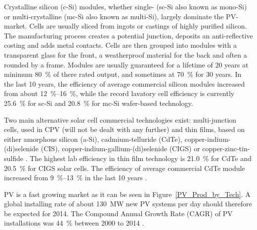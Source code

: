 Crystalline silicon (c-Si) modules, whether single- (sc-Si also known as mono-Si) or multi-crystalline (mc-Si also known as multi-Si), largely dominate the PV-market. Cells are usually sliced from ingots or castings of highly purified silicon. The manufacturing process creates a potential junction, deposits an anti-reflective costing and adds metal contacts. Cells are then grouped into modules with a transparent glass for the front, a weatherproof material for the back and often a rounded by a frame. Modules are usually guaranteed for a lifetime of 20 years at minimum \SI{80}{\percent} of there rated output, and sometimes at \SI{70}{\percent} for 30 years. In the last 10 years, the efficiency of average commercial silicon modules increased from about \SIrange{12}{16}{\percent}, while the record lavatory cell efficiency is currently \SI{25.6}{\percent} for sc-Si and \SI{20.8}{\percent} for mc-Si wafer-based technology. \cite{FraunhoferISE2015}

Two main alternative solar cell commercial technologies exist: multi-junction cells, used in CPV (will not be dealt with any further) and thin films, based on either amorphous silicon (a-Si), cadmium-telluride (CdTe), copper-indium-(di)selenide (CIS), copper-indium-gallium-(di)selenide (CIGS) or copper-zinc-tin-sulfide \cite{IEA2014c}. The highest lab efficiency in thin film technology is \SI{21.0}{\percent} for CdTe and \SI{20.5}{\percent} for CIGS solar cells. The efficiency of average commercial CdTe module increased from \SIrange{9}{13}{\percent} in the last 10 years \cite{FraunhoferISE2015}.

PV is a fast growing market as it can be seen in Figure~\ref{PV_Prod_by_Tech}. A global installing rate of about \SI{130}{\mega\watt} new PV systems per day should therefore be expected for 2014. The Compound Annual Growth Rate (CAGR) of PV installations was \SI{44}{\percent} between 2000 to 2014 \cite{FraunhoferISE2015}. 

